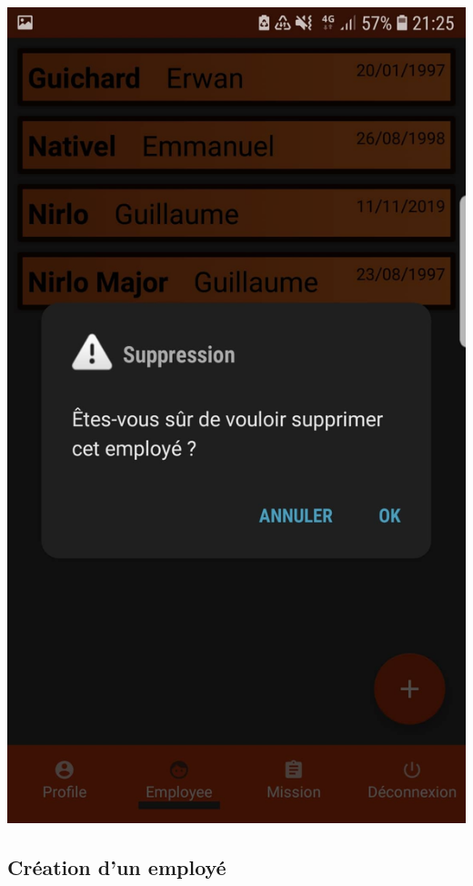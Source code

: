 \documentclass{article}
\begin{document}
\begin{center}
    \includegraphics[scale=0.1]{suppE.jpg}
\end{center}

\subsection{Création d'un employé}
\end{document}
